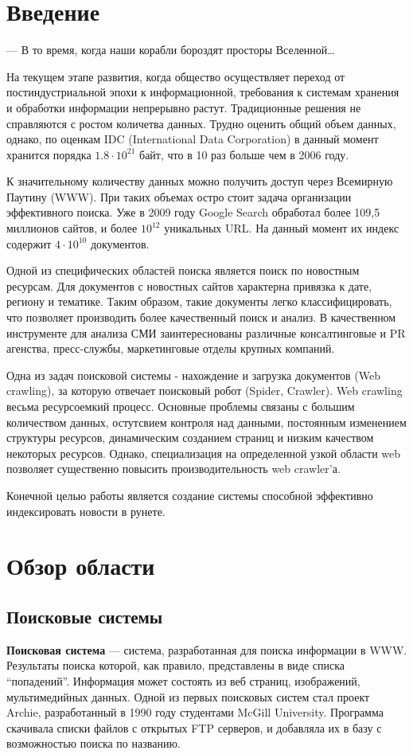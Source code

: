 \chapter*{Введение}
\epigraph{— В то время, когда наши корабли бороздят просторы
Вселенной…}{} На текущем этапе развития, когда общество осуществляет переход от
постиндустриальной эпохи к информационной, требования к системам хранения и
обработки информации непрерывно растут. Традиционные решения не справляются с
ростом количетва данных. Трудно оценить общий объем данных, однако, по оценкам
IDC (International Data Corporation) в данный момент хранится порядка
$1.8\cdot10^{21}$ байт, что в 10 раз больше чем в 2006 году.

К значительному количеству данных можно получить доступ через Всемирную Паутину
(WWW). При таких объемах остро стоит задача организации эффективного поиска. Уже
в 2009 году Google Search обработал более 109,5 миллионов сайтов, и более
$10^{12}$ уникальных URL. На данный момент их индекс содержит $4\cdot10^{10}$ документов.

Одной из специфических областей поиска является поиск по новостным ресурсам.
 Для документов с новостных сайтов характерна привязка к дате, региону и тематике.
 Таким образом, такие документы легко классифицировать, что позволяет производить более качественный поиск и анализ.
 В качественном инструменте для анализа СМИ заинтереснованы различные консалтинговые и PR агенства, пресс-службы, маркетинговые отделы крупных компаний.

Одна из задач поисковой системы - нахождение и загрузка документов (Web crawling), за которую отвечает поисковый робот (Spider, Crawler).
 Web crawling весьма ресурсоемкий процесс. Основные проблемы связаны с большим количеством данных,
 остутсвием  контроля над данными, постоянным изменением структуры ресурсов, динамическим созданием страниц и низким качеством некоторых ресурсов.
 Однако, специализация на определенной узкой области web позволяет существенно повысить производительность web crawler'а.

Конечной целью работы является создание системы способной эффективно индексировать новости в рунете.

\chapter{Обзор области}
\section{Поисковые системы}
\textbf{Поисковая система} --- система, разработанная для
поиска информации в WWW. Результаты поиска которой, как правило, представлены в
виде списка ``попадений''. Информация может состоять из веб страниц,  изображений,
мультимедийных данных. Одной из первых поисковых систем стал
проект Archie, разработанный в 1990 году студентами McGill University. Программа скачивала
списки файлов с открытых FTP серверов, и добавляла их в базу с возможностью
поиска по названию. %


